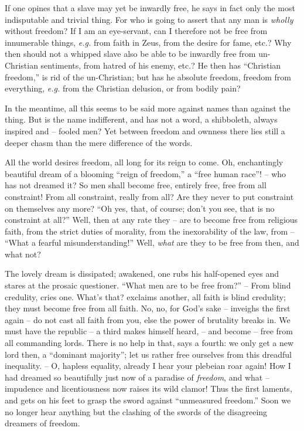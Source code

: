 \documentclass[12pt,a4paper]{book}
\begin{document}
If one opines that a slave may yet be inwardly free, he says in fact only the 
most indisputable and trivial thing. For who is going to assert that any man 
is \textit{wholly} without freedom? If I am an eye-servant, can I therefore 
not be free from innumerable things, \textit{e.g.} from faith in Zeus, from 
the desire for fame, etc.? Why then should not a whipped slave also be able to 
be inwardly free from un-Christian sentiments, from hatred of his enemy, etc.? 
He then has ``Christian freedom,'' is rid of the un-Christian; but has he 
absolute freedom, freedom from everything, \textit{e.g.} from the Christian 
delusion, or from bodily pain?

In the meantime, all this seems to be said more against names than against the 
thing. But is the name indifferent, and has not a word, a shibboleth, always 
inspired and -- fooled men? Yet between freedom and ownness there lies still a 
deeper chasm than the mere difference of the words.

All the world desires freedom, all long for its reign to come. Oh, 
enchantingly beautiful dream of a blooming ``reign of freedom,'' a ``free 
human race''! -- who has not dreamed it? So men shall become free, entirely 
free, free from all constraint! From all constraint, really from all? Are they 
never to put constraint on themselves any more? ``Oh yes, that, of course; 
don't you see, that is no constraint at all?'' Well, then at any rate they -- 
are to become free from religious faith, from the strict duties of morality, 
from the inexorability of the law, from -- ``What a fearful 
misunderstanding!'' Well, \textit{what} are they to be free from then, and 
what not?

The lovely dream is dissipated; awakened, one rubs his half-opened eyes and 
stares at the prosaic questioner. ``What men are to be free from?'' -- From 
blind credulity, cries one. What's that? exclaims another, all faith is blind 
credulity; they must become free from all faith. No, no, for God's sake -- 
inveighs the first again -- do not cast all faith from you, else the power of 
brutality breaks in. We must have the republic -- a third makes himself heard, 
-- and become -- free from all commanding lords. There is no help in that, 
says a fourth: we only get a new lord then, a ``dominant majority''; let us 
rather free ourselves from this dreadful inequality. -- O, hapless equality, 
already I hear your plebeian roar again! How I had dreamed so beautifully just 
now of a paradise of \textit{freedom}, and what -- impudence and 
licentiousness now raises its wild clamor! Thus the first laments, and gets on 
his feet to grasp the sword against ``unmeasured freedom.'' Soon we no 
longer hear anything but the clashing of the swords of the disagreeing 
dreamers of freedom.
\end{document}
